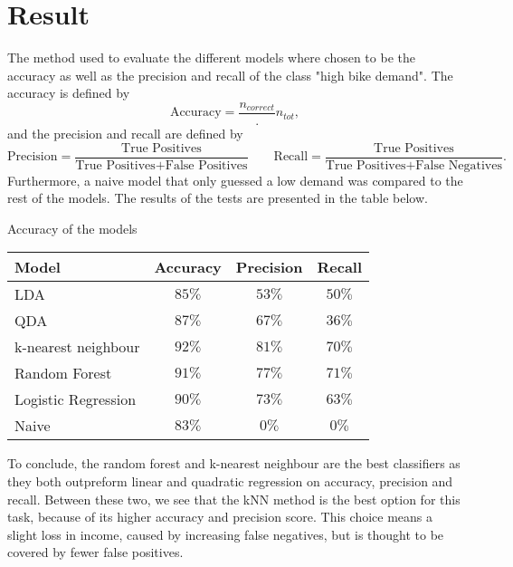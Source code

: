 \section{Result}

    The method used to evaluate the different models where chosen to be the accuracy as well as the precision and recall of the class "high bike demand".
    The accuracy is defined  by
        \begin{equation*}
            \text{Accuracy} = \frac{n_{correct}}.{n_{tot}},
        \end{equation*}
    and the precision and recall are defined by
        \begin{equation*}
            \text{Precision} = \frac{\text{True Positives}}{\text{True Positives} + \text{False Positives}}
            \qquad
            \text{Recall} = \frac{\text{True Positives}}{\text{True Positives} + \text{False Negatives}}.
        \end{equation*}
    Furthermore, a naive model that only guessed  a low demand was compared to the rest of the models. The results of the tests are presented in the table below.
    \begin{table*}[h]
        \begin{center}
            Accuracy of the models
            \\
            \begin{tabular}{|l|c|c|c|}
                \hline
                Model & Accuracy & Precision & Recall \\
                \hline
                LDA & $85\%$ & $53\%$ & $50\%$ \\
                QDA & $87\%$ & $67\%$ & $36\%$ \\
                k-nearest neighbour & $92\%$ & $81\%$ & $70\%$ \\
                Random Forest & $91\%$ & $77\%$ &$71\%$ \\
                Logistic Regression & $90\%$ & $73\%$ &$63\%$ \\ 
                Naive & $83\%$ & $0\%$ & $0\%$ \\
                \hline
            \end{tabular}
        \end{center}
    \end{table*}
    
    To conclude, the random forest and k-nearest neighbour are the best classifiers as they both outpreform linear and quadratic regression on accuracy, precision and recall. Between these two, we see that the kNN method is the best option for this task, because of its higher accuracy and precision score. This choice means a slight loss in income, caused by increasing false negatives, but is thought to be covered by fewer false positives.
    